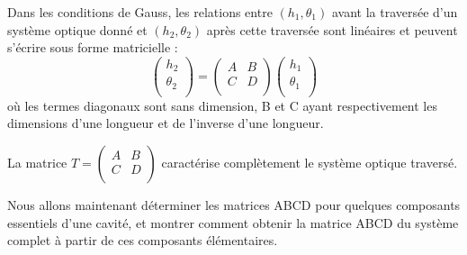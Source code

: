 \documentclass{book}
\begin{document}
Dans les conditions de Gauss, les relations entre $(h_1 , \theta_1)$ avant la traversée d'un système optique donné et $(h_2 , \theta_2)$ après cette traversée sont linéaires et peuvent s'écrire sous forme matricielle : $$\begin{pmatrix}
            h_2 \\
            \theta_2 \\
            \end{pmatrix} = 
            \begin{pmatrix}
            A & B \\
            C & D \\
            \end{pmatrix} 
            \begin{pmatrix}
            h_1 \\
            \theta_1 \\
            \end{pmatrix}$$
où les termes diagonaux sont sans dimension, B et C ayant respectivement les dimensions d'une longueur et de l'inverse d'une longueur. 

La matrice $T = \begin{pmatrix}
            A & B \\
            C & D \\
            \end{pmatrix}$ caractérise complètement le système optique traversé.

Nous allons maintenant déterminer les matrices ABCD pour quelques composants essentiels d'une cavité, et montrer comment obtenir la matrice ABCD du système complet à partir de ces composants élémentaires.
\end{document}
